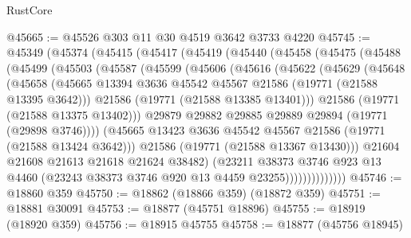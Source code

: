 \begin{lexlean}{RustCore}
\begin{coremodule}
@45665 := @45526 @303 @11 @30 @4519 @3642 @3733 @4220
@45745 := @45349
    (@45374
      (@45415
        (@45417
          (@45419
            (@45440
              (@45458
                (@45475
                  (@45488
                    (@45499
                      (@45503
                        (@45587
                          (@45599
                            (@45606
                              (@45616
                                (@45622
                                  (@45629
                                    (@45648
                                      (@45658
                                        (@45665
                                          @13394
                                          @3636
                                          @45542
                                          @45567
                                          @21586
                                          (@19771 (@21588 @13395 @3642)))
                                        @21586
                                        (@19771 (@21588 @13385 @13401)))
                                      @21586
                                      (@19771 (@21588 @13375 @13402)))
                                    @29879
                                    @29882
                                    @29885
                                    @29889
                                    @29894
                                    (@19771 (@29898 @3746))))
                                (@45665
                                  @13423
                                  @3636
                                  @45542
                                  @45567
                                  @21586
                                  (@19771 (@21588 @13424 @3642)))
                                @21586
                                (@19771 (@21588 @13367 @13430)))
                              @21604
                              @21608
                              @21613
                              @21618
                              @21624
                              @38482)
                            (@23211
                              @38373
                              @3746
                              @923
                              @13
                              @4460
                              (@23243 @38373 @3746 @920 @13 @4459 @23255))))))))))))))
@45746 := @18860 @359
@45750 := @18862 (@18866 @359) (@18872 @359)
@45751 := @18881 @30091
@45753 := @18877 (@45751 @18896)
@45755 := @18919 (@18920 @359)
@45756 := @18915 @45755
@45758 := @18877 (@45756 @18945)

\end{coremodule}
\end{lexlean}
